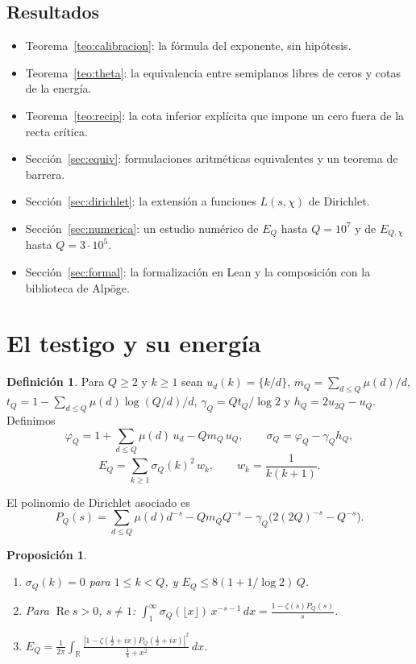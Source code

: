 \documentclass[11pt,a4paper]{amsart}
\newtheorem{proposicion}[teorema]{Proposici\'on}
\theoremstyle{definition}
\newtheorem{definicion}[teorema]{Definici\'on}
\theoremstyle{remark}
\renewcommand{\Re}{\operatorname{Re}}
\begin{document}
\subsection*{Resultados}
\begin{itemize}
\item Teorema~\ref{teo:calibracion}: la f\'ormula del exponente, sin hip\'otesis.
\item Teorema~\ref{teo:theta}: la equivalencia entre semiplanos libres de ceros y cotas de la energ\'ia.
\item Teorema~\ref{teo:recip}: la cota inferior expl\'icita que impone un cero fuera de la recta cr\'itica.
\item Secci\'on~\ref{sec:equiv}: formulaciones aritm\'eticas equivalentes y un teorema de barrera.
\item Secci\'on~\ref{sec:dirichlet}: la extensi\'on a funciones $L(s,\chi)$ de Dirichlet.
\item Secci\'on~\ref{sec:numerica}: un estudio num\'erico de $E_Q$ hasta $Q=10^7$ y de $E_{Q,\chi}$ hasta $Q=3\cdot10^5$.
\item Secci\'on~\ref{sec:formal}: la formalizaci\'on en Lean y la composici\'on con la biblioteca de Alp\"oge.
\end{itemize}

\section{El testigo y su energ\'ia}

\begin{definicion}
Para $Q\ge2$ y $k\ge1$ sean $u_d(k)=\{k/d\}$, $m_Q=\sum_{d\le Q}\mu(d)/d$, $t_Q=1-\sum_{d\le Q}\mu(d)\log(Q/d)/d$, $\gamma_Q=Qt_Q/\log2$ y $h_Q=2u_{2Q}-u_Q$. Definimos
\[
\varphi_Q=1+\sum_{d\le Q}\mu(d)\,u_d-Qm_Q\,u_Q,\qquad
\sigma_Q=\varphi_Q-\gamma_Q h_Q,
\]
\[
E_Q=\sum_{k\ge1}\sigma_Q(k)^2\,w_k,\qquad w_k=\frac1{k(k+1)}.
\]
\end{definicion}

El polinomio de Dirichlet asociado es
\[
P_Q(s)=\sum_{d\le Q}\mu(d)d^{-s}-Qm_QQ^{-s}-\gamma_Q\bigl(2(2Q)^{-s}-Q^{-s}\bigr).
\]

\begin{proposicion}\label{prop:mellin}
\begin{enumerate}
\item $\sigma_Q(k)=0$ para $1\le k<Q$, y $E_Q\le 8(1+1/\log2)\,Q$.
\item Para $\Re s>0$, $s\ne1$: $\displaystyle\int_1^\infty\sigma_Q(\lfloor x\rfloor)\,x^{-s-1}\,dx=\frac{1-\zeta(s)P_Q(s)}{s}$.
\item $\displaystyle E_Q=\frac1{2\pi}\int_{\mathbb R}\frac{|1-\zeta(\tfrac12+ix)P_Q(\tfrac12+ix)|^2}{\tfrac14+x^2}\,dx$.
\end{enumerate}
\end{proposicion}
\end{document}

